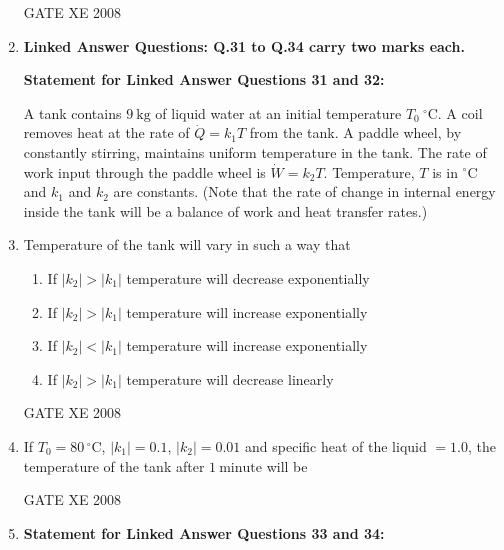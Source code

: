 \documentclass[12pt]{article}
\begin{document}
\begin{enumerate}[label=Q\arabic*.]
 GATE XE 2008  

\item[] \textbf{\Large Linked Answer Questions: Q.31 to Q.34 carry two marks each.}

\textbf{Statement for Linked Answer Questions 31 and 32:}  

A tank contains $9~\mathrm{kg}$ of liquid water at an initial temperature $T_0~^{\circ}\mathrm{C}$.  
A coil removes heat at the rate of $\dot{Q} = k_1 T$ from the tank. A paddle wheel, by constantly stirring, maintains uniform temperature in the tank.  
The rate of work input through the paddle wheel is $\dot{W} = k_2 T$. Temperature, $T$ is in $^{\circ}\mathrm{C}$ and $k_1$ and $k_2$ are constants.  
(Note that the rate of change in internal energy inside the tank will be a balance of work and heat transfer rates.)  

\item Temperature of the tank will vary in such a way that  

\begin{enumerate}[label=(\Alph*)]
\item  If $|k_2| > |k_1|$ temperature will decrease exponentially  
\item  If $|k_2| > |k_1|$ temperature will increase exponentially  
\item  If $|k_2| < |k_1|$ temperature will increase exponentially  
\item  If $|k_2| > |k_1|$ temperature will decrease linearly  
\end{enumerate}

GATE XE 2008  

\item If $T_0 = 80\,^{\circ}\mathrm{C}$, $|k_1| = 0.1$, $|k_2| = 0.01$ and specific heat of the liquid $= 1.0$, the temperature of the tank after $1~\mathrm{minute}$ will be  

\begin{enumerate}[label=(\Alph*)]
\end{enumerate}

GATE XE 2008  

\item[] \textbf{Statement for Linked Answer Questions 33 and 34:}  


\end{enumerate}
\end{document}
